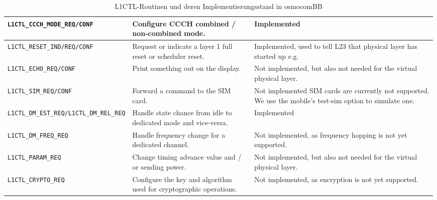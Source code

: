 \begin{table}[H]
\begin{adjustbox}{max width={0.8\textwidth}, padding=4pt 2pt 4pt 0pt, center}
\begin{tabular}{|p{5cm}|p{5cm}|p{5cm}|}
\texttt{L1CTL\_CCCH\_MODE\_REQ/CONF}             & Configure CCCH combined / non-combined mode.                                              & Implemented                                                                                                 \\ \hline
\texttt{L1CTL\_RESET\_IND/REQ/CONF}              & Request or indicate a layer 1 full reset or scheduler reset.                              & Implemented, used to tell L23 that physical layer has started up e.g.                                       \\ \hline
\texttt{L1CTL\_ECHO\_REQ/CONF}                   & Print something out on the display.                                                       & Not implemented, but also not needed for the virtual physical layer.                                        \\ \hline
\texttt{L1CTL\_SIM\_REQ/CONF}                    & Forward a command to the SIM card.                                                        & Not implemented SIM cards are currently not supported. We use the mobile's test-sim option to simulate one. \\ \hline
\texttt{L1CTL\_DM\_EST\_REQ/L1CTL\_DM\_REL\_REQ} & Handle state chance from idle to dedicated mode and vice-versa.                           & Implemented                                                                                                 \\ \hline
\texttt{L1CTL\_DM\_FREQ\_REQ}                    & Handle frequency change for a dedicated channel.                                          & Not implemented, as frequency hopping is not yet supported.                                                 \\ \hline
\texttt{L1CTL\_PARAM\_REQ}                       & Change timing advance value and / or sending power.                                       & Not implemented, but also not needed for the virtual physical layer.                                        \\ \hline
\texttt{L1CTL\_CRYPTO\_REQ}                      & Configure the key and algorithm used for cryptographic operations.                        & Not implemented, as encryption is not yet supported.                                                        \\ \hline
\end{tabular}
\end{adjustbox}\caption[L1CTL-Routinen und deren Implementierungsstand in osmocomBB]{\ac{L1CTL}-Routinen und deren Implementierungsstand in osmocomBB}\label{hdl:a_l1ctl_routines}
\end{table}

